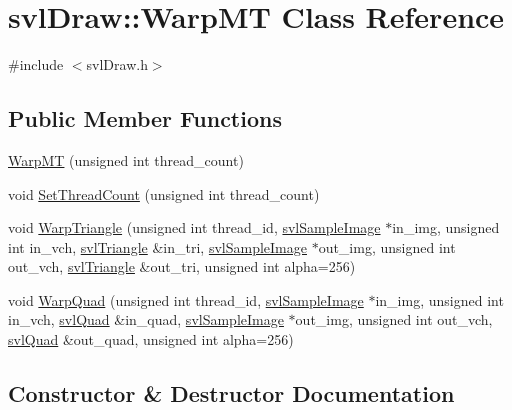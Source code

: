 \hypertarget{classsvl_draw_1_1_warp_m_t}{}\section{svl\+Draw\+:\+:Warp\+M\+T Class Reference}
\label{classsvl_draw_1_1_warp_m_t}


{\ttfamily \#include $<$svl\+Draw.\+h$>$}

\subsection*{Public Member Functions}
\begin{DoxyCompactItemize}
\item 
\hyperlink{classsvl_draw_1_1_warp_m_t_ac1580a825326653b36827d25871c78a1}{Warp\+M\+T} (unsigned int thread\+\_\+count)
\item 
void \hyperlink{classsvl_draw_1_1_warp_m_t_a6ce9f710eba435f1af725f54ffc6308c}{Set\+Thread\+Count} (unsigned int thread\+\_\+count)
\item 
void \hyperlink{classsvl_draw_1_1_warp_m_t_a7a4cbe1b77653ddb263d4614509147b0}{Warp\+Triangle} (unsigned int thread\+\_\+id, \hyperlink{classsvl_sample_image}{svl\+Sample\+Image} $\ast$in\+\_\+img, unsigned int in\+\_\+vch, \hyperlink{structsvl_triangle}{svl\+Triangle} \&in\+\_\+tri, \hyperlink{classsvl_sample_image}{svl\+Sample\+Image} $\ast$out\+\_\+img, unsigned int out\+\_\+vch, \hyperlink{structsvl_triangle}{svl\+Triangle} \&out\+\_\+tri, unsigned int alpha=256)
\item 
void \hyperlink{classsvl_draw_1_1_warp_m_t_a664d3f1774ef1b3c72a665b7068178d7}{Warp\+Quad} (unsigned int thread\+\_\+id, \hyperlink{classsvl_sample_image}{svl\+Sample\+Image} $\ast$in\+\_\+img, unsigned int in\+\_\+vch, \hyperlink{structsvl_quad}{svl\+Quad} \&in\+\_\+quad, \hyperlink{classsvl_sample_image}{svl\+Sample\+Image} $\ast$out\+\_\+img, unsigned int out\+\_\+vch, \hyperlink{structsvl_quad}{svl\+Quad} \&out\+\_\+quad, unsigned int alpha=256)
\end{DoxyCompactItemize}


\subsection{Constructor \& Destructor Documentation}
\hypertarget{classsvl_draw_1_1_warp_m_t_ac1580a825326653b36827d25871c78a1}{}

